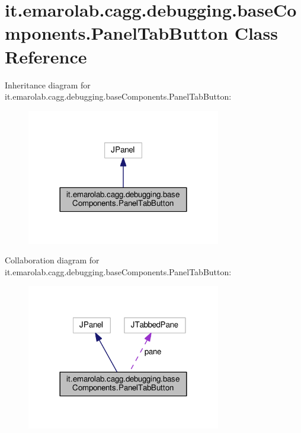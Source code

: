 \hypertarget{classit_1_1emarolab_1_1cagg_1_1debugging_1_1baseComponents_1_1PanelTabButton}{\section{it.\-emarolab.\-cagg.\-debugging.\-base\-Components.\-Panel\-Tab\-Button Class Reference}
\label{classit_1_1emarolab_1_1cagg_1_1debugging_1_1baseComponents_1_1PanelTabButton}
}


Inheritance diagram for it.\-emarolab.\-cagg.\-debugging.\-base\-Components.\-Panel\-Tab\-Button\-:\nopagebreak
\begin{figure}[H]
\begin{center}
\leavevmode
\includegraphics[width=240pt]{classit_1_1emarolab_1_1cagg_1_1debugging_1_1baseComponents_1_1PanelTabButton__inherit__graph}
\end{center}
\end{figure}


Collaboration diagram for it.\-emarolab.\-cagg.\-debugging.\-base\-Components.\-Panel\-Tab\-Button\-:\nopagebreak
\begin{figure}[H]
\begin{center}
\leavevmode
\includegraphics[width=240pt]{classit_1_1emarolab_1_1cagg_1_1debugging_1_1baseComponents_1_1PanelTabButton__coll__graph}
\end{center}
\end{figure}
